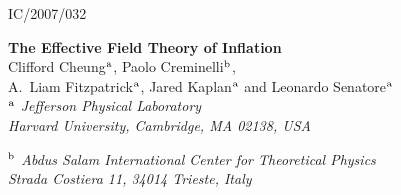 \documentclass[12pt,letterpaper]{article}
\begin{document}
\begin{flushright} {\footnotesize IC/2007/032}  \end{flushright}
\vspace{5mm}
\vspace{0.5cm}
\begin{center}

\def\thefootnote{\fnsymbol{footnote}}

{\Large \bf The Effective Field Theory of Inflation}
\\[0.5cm]
{\large Clifford Cheung$^{\rm a}$, Paolo Creminelli$^{\rm b}$,\\[.1cm]
 A.~Liam Fitzpatrick$^{\rm a}$, Jared Kaplan$^{\rm a}$
and Leonardo Senatore$^{\rm a}$}
\\[0.5cm]


{\small
\textit{$^{\rm a}$ Jefferson Physical Laboratory \\
Harvard University, Cambridge, MA 02138, USA}}

\vspace{.2cm}

{\small \textit{$^{\rm b}$ Abdus Salam International Center for
Theoretical Physics\\ Strada Costiera 11, 34014 Trieste, Italy}}

\end{center}

\vspace{.8cm}
\end{document}
